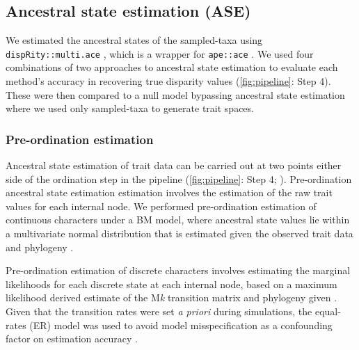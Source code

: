 \documentclass[11pt, a4paper]{article}
\newcommand{\ase}{ancestral state estimation }
\begin{document}
\subsection{Ancestral state estimation (ASE)} 
We estimated the ancestral states of the sampled-taxa using \texttt{dispRity::multi.ace} \citep{guillerme2018disprity}, which is a wrapper for \texttt{ape::ace} \citep{paradis2019ape}.
We used four combinations of two approaches to ancestral state estimation to evaluate each method's accuracy in recovering true disparity values (\autoref{fig:pipeline}: Step 4).
These were then compared to a null model  bypassing ancestral state estimation where we used only sampled-taxa to generate trait spaces.

\subsubsection{Pre-ordination estimation} \label{pre-ord}
Ancestral state estimation of trait data can be carried out at two points either side of the ordination step in the pipeline (\autoref{fig:pipeline}: Step 4; \citealp{lloyd2018journeys}).
Pre-ordination \ase estimation involves the estimation of the raw trait values for each internal node. 
We performed pre-ordination estimation of continuous characters under a BM model, where ancestral state values lie within a multivariate normal distribution that is estimated given the observed trait data and phylogeny \citep{schluter1997likelihood,rohlf2001comparative}.

Pre-ordination estimation of discrete characters involves estimating the marginal likelihoods for each discrete state at each internal node, based on a maximum likelihood derived estimate of the M\textit{k} transition matrix and phylogeny given \citep{pagel1999maximum,yang2006computational}.
Given that the transition rates were set \textit{a priori} during simulations, the equal-rates (ER) model was used to avoid model misspecification as a confounding factor on estimation accuracy \citep{keating2023best}.
\end{document}
